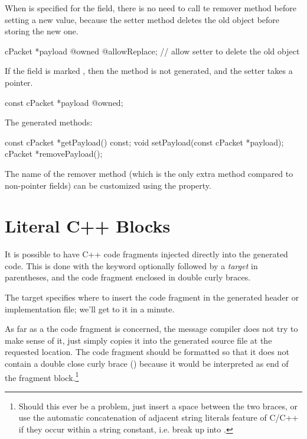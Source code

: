 When  is specified for the field, there is no need to call
te remover method before setting a new value, because the setter method deletes
the old object before storing the new one.

\begin{msg}
cPacket *payload @owned @allowReplace; // allow setter to delete the old object
\end{msg}

If the field is marked , then the  method
is not generated, and the setter takes a  pointer.

\begin{msg}
const cPacket *payload @owned;
\end{msg}

The generated methods:

\begin{cpp}
const cPacket *getPayload() const;
void setPayload(const cPacket *payload);
cPacket *removePayload();
\end{cpp}

The name of the remover method (which is the only extra method compared to
non-pointer fields) can be customized using the  property.


\section{Literal C++ Blocks}
\label{sec:msg-defs:cplusplus-blocks}

It is possible to have C++ code fragments injected directly into the generated
code. This is done with the  keyword optionally followed by
a \textit{target} in parentheses, and the code fragment enclosed in double curly
braces.

The target specifies where to insert the code fragment in the generated header
or implementation file; we'll get to it in a minute.

As far as a the code fragment is concerned, the message compiler does not try to
make sense of it, just simply copies it into the generated source file at the
requested location. The code fragment should be formatted so that it does not
contain a double close curly brace (\ttt{\}\}}) because it would be interpreted as
end of the fragment block.\footnote{Should this ever be a problem, just insert a space
between the two braces, or use the automatic concatenation of adjacent string literals
feature of C/C++ if they occur within a string constant, i.e. break up 
into .}

